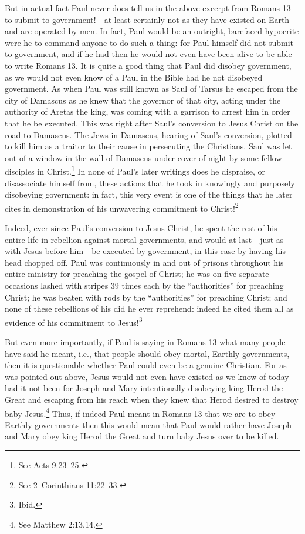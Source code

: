 \documentclass[letterpaper,12pt]{article}
\begin{document}
But in actual fact Paul never does tell us in the above excerpt from Romans 13 to submit to government!---at least certainly not as they have existed on Earth and are operated by men. In fact, Paul would be an outright, barefaced hypocrite were he to command anyone to do such a thing: for Paul himself did not submit to government, and if he had then he would not even have been alive to be able to write Romans 13. It is quite a good thing that Paul did disobey government, as we would not even know of a Paul in the Bible had he not disobeyed government. As when Paul was still known as Saul of Tarsus he escaped from the city of Damascus as he knew that the governor of that city, acting under the authority of Aretas the king, was coming with a garrison to arrest him in order that he be executed. This was right after Saul's conversion to Jesus Christ on the road to Damascus. The Jews in Damascus, hearing of Saul's conversion, plotted to kill him as a traitor to their cause in persecuting the Christians. Saul was let out of a window in the wall of Damascus under cover of night by some fellow disciples in Christ.\footnote{See Acts 9:23--25.} In none of Paul's later writings does he dispraise, or disassociate himself from, these actions that he took in knowingly and purposely disobeying government: in fact, this very event is one of the things that he later cites in demonstration of his unwavering commitment to Christ!\footnote{See 2~Corinthians 11:22--33.}

Indeed, ever since Paul's conversion to Jesus Christ, he spent the rest of his entire life in rebellion against mortal governments, and would at last---just as with Jesus before him---be executed by government, in this case by having his head chopped off. Paul was continuously in and out of prisons throughout his entire ministry for preaching the gospel of Christ; he was on five separate occasions lashed with stripes 39 times each by the ``authorities'' for preaching Christ; he was beaten with rods by the ``authorities'' for preaching Christ; and none of these rebellions of his did he ever reprehend: indeed he cited them all as evidence of his commitment to Jesus!\footnote{Ibid.}

But even more importantly, if Paul is saying in Romans 13 what many people have said he meant, i.e., that people should obey mortal, Earthly governments, then it is questionable whether Paul could even be a genuine Christian. For as was pointed out above, Jesus would not even have existed as we know of today had it not been for Joseph and Mary intentionally disobeying king Herod the Great and escaping from his reach when they knew that Herod desired to destroy baby Jesus.\footnote{See Matthew 2:13,14.} Thus, if indeed Paul meant in Romans 13 that we are to obey Earthly governments then this would mean that Paul would rather have Joseph and Mary obey king Herod the Great and turn baby Jesus over to be killed.
\end{document}
